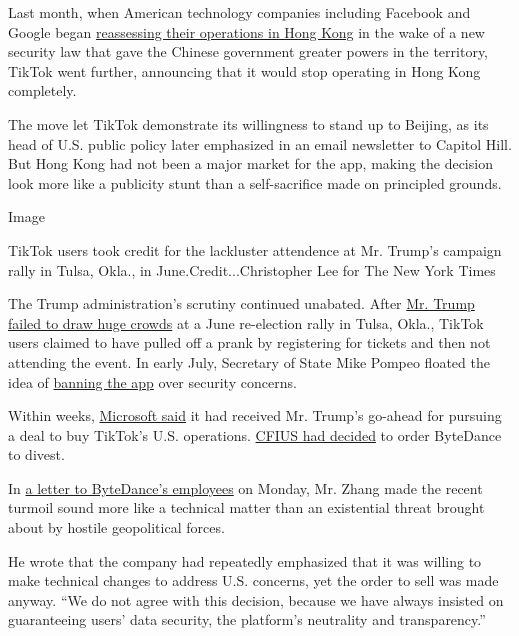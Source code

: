 Last month, when American technology companies including Facebook and
Google began
\href{https://www.nytimes3xbfgragh.onion/2020/07/07/business/hong-kong-security-law-tech.html}{reassessing
their operations in Hong Kong} in the wake of a new security law that
gave the Chinese government greater powers in the territory, TikTok went
further, announcing that it would stop operating in Hong Kong
completely.

The move let TikTok demonstrate its willingness to stand up to Beijing,
as its head of U.S. public policy later emphasized in an email
newsletter to Capitol Hill. But Hong Kong had not been a major market
for the app, making the decision look more like a publicity stunt than a
self-sacrifice made on principled grounds.

Image

TikTok users took credit for the lackluster attendence at Mr. Trump's
campaign rally in Tulsa, Okla., in June.Credit...Christopher Lee for The
New York Times

The Trump administration's scrutiny continued unabated. After
\href{https://www.nytimes3xbfgragh.onion/2020/06/21/style/tiktok-trump-rally-tulsa.html}{Mr.
Trump failed to draw huge crowds} at a June re-election rally in Tulsa,
Okla., TikTok users claimed to have pulled off a prank by registering
for tickets and then not attending the event. In early July, Secretary
of State Mike Pompeo floated the idea of
\href{https://www.cnbc.com/2020/07/07/us-looking-at-banning-tiktok-and-chinese-social-media-apps-pompeo.html}{banning
the app} over security concerns.

Within weeks,
\href{https://www.nytimes3xbfgragh.onion/2020/08/02/business/economy/trump-tiktok-china-national-security.html}{Microsoft
said} it had received Mr. Trump's go-ahead for pursuing a deal to buy
TikTok's U.S. operations.
\href{https://www.nytimes3xbfgragh.onion/2020/07/31/technology/tiktok-microsoft.html}{CFIUS
had decided} to order ByteDance to divest.

In
\href{https://www.toutiao.com/i6856642212948607502/?timestamp=1596448119\&app=news_article\&group_id=6856642212948607502\&use_new_style=1\&req_id=2020080317483801001404814024245E48}{a
letter to ByteDance's employees} on Monday, Mr. Zhang made the recent
turmoil sound more like a technical matter than an existential threat
brought about by hostile geopolitical forces.

He wrote that the company had repeatedly emphasized that it was willing
to make technical changes to address U.S. concerns, yet the order to
sell was made anyway. ``We do not agree with this decision, because we
have always insisted on guaranteeing users' data security, the
platform's neutrality and transparency.''

